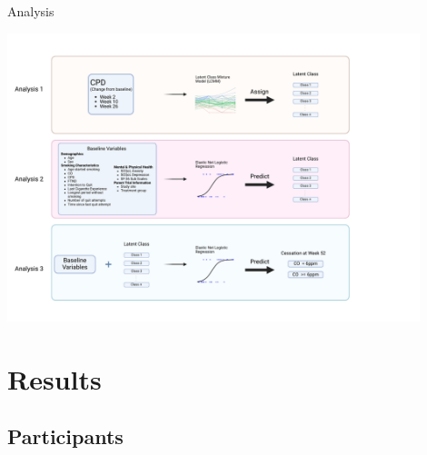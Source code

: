 \documentclass[aspectratio=169]{beamer}
\begin{document}
\begin{frame}{Analysis}
	
	
	\centering
	\includegraphics[width=0.9\textwidth]{overview}
	
\end{frame}

\section{Results}
\subsection{Participants}
\end{document}
